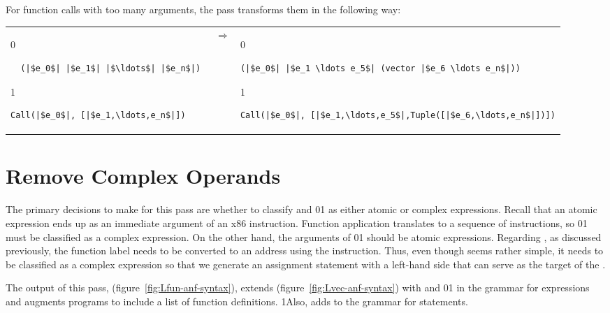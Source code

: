 \documentclass[7x10]{TimesAPriori_MIT}%
\def\racketEd{0}
\def\pythonEd{1}
\providecommand{\BookEdition}{1}
\let\edition\BookEdition
\newcommand{\racket}[1]{{\if\edition\racketEd{#1}\fi}}
\newcommand{\pythonColor}[0]{}
\newcommand{\python}[1]{{\if\edition\pythonEd\pythonColor #1\fi}}
\numberwithin{theorem}{chapter}
\numberwithin{definition}{chapter}
\numberwithin{equation}{chapter}
\begin{document}
For function calls with too many arguments, the 
pass transforms them in the following way:

\begin{tabular}{lll}
\begin{minipage}{0.3\textwidth}
{\if\edition\racketEd
\begin{lstlisting}
  (|$e_0$| |$e_1$| |$\ldots$| |$e_n$|) 
\end{lstlisting}
\fi}
{\if\edition\pythonEd\pythonColor
\begin{lstlisting}
Call(|$e_0$|, [|$e_1,\ldots,e_n$|])
\end{lstlisting}
\fi}
\end{minipage}
&
$\Rightarrow$
&
\begin{minipage}{0.5\textwidth}
{\if\edition\racketEd
\begin{lstlisting}
(|$e_0$| |$e_1 \ldots e_5$| (vector |$e_6 \ldots e_n$|))
\end{lstlisting}
\fi}
{\if\edition\pythonEd\pythonColor
\begin{lstlisting}
Call(|$e_0$|, [|$e_1,\ldots,e_5$|,Tuple([|$e_6,\ldots,e_n$|])])
\end{lstlisting}
\fi}
\end{minipage}
\end{tabular}


\section{Remove Complex Operands}
\label{sec:rco-r4}

The primary decisions to make for this pass are whether to classify
 and \racket{}\python{} as either
atomic or complex expressions. Recall that an atomic expression 
ends up as an immediate argument of an x86 instruction. Function
application translates to a sequence of instructions, so
\racket{}\python{} must be classified as
a complex expression.  On the other hand, the arguments of
\racket{}\python{} should be atomic
expressions.
%
Regarding , as discussed previously, the function label
needs to be converted to an address using the 
instruction. Thus, even though  seems rather simple, it
needs to be classified as a complex expression so that we generate an
assignment statement with a left-hand side that can serve as the
target of the .

The output of this pass, \LangFunANF{} (figure~\ref{fig:Lfun-anf-syntax}),
extends \LangAllocANF{} (figure~\ref{fig:Lvec-anf-syntax}) with 
and \racket{}\python{} in the grammar for expressions
and augments programs to include a list of function definitions.
%
\python{Also, \LangFunANF{} adds  to the grammar for statements.}
\end{document}
